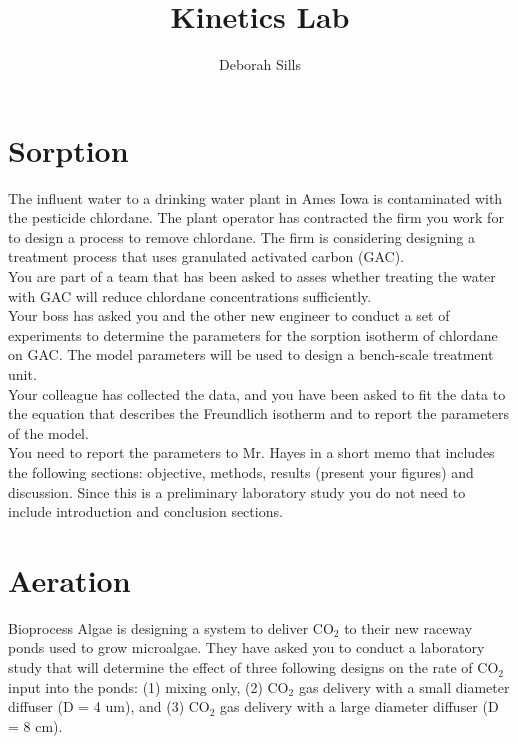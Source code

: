 \documentclass[12pt,letterpaper]{article}
\begin{document}
\setlength{\parindent}{0cm} 


\frenchspacing

\title {\textbf{Kinetics Lab}} 

\author {Deborah Sills}
\maketitle
\section {Sorption}
The influent water to a drinking water plant in Ames Iowa is contaminated with the pesticide chlordane.  The plant operator has contracted the firm you work for to design a process to remove chlordane. The firm is considering designing a treatment process that uses granulated activated carbon (GAC).\\

You are part of a team that has been asked to asses whether treating the water with GAC will reduce chlordane concentrations sufficiently.\\

Your boss has asked you and the other new engineer to conduct a set of experiments to determine the parameters for the sorption isotherm of chlordane on GAC.  The model  parameters will be used to design a bench-scale treatment unit.\\

Your colleague has collected the data, and you have been asked to fit the data to the equation that describes the Freundlich isotherm and to report the parameters of the model.\\

You need to report the parameters to Mr. Hayes in a short memo that includes the following sections: objective, methods, results (present your figures) and discussion. Since this is a preliminary laboratory study you do not need to include introduction and conclusion sections.

\section {Aeration}
Bioprocess Algae is designing a system to deliver CO$_2$ to their new raceway ponds used to grow microalgae.  They have asked you to conduct a laboratory study that will determine the effect of three following designs on the rate of CO$_2$ input into the ponds: (1) mixing only, (2) CO$_2$ gas delivery with a small diameter diffuser (D = 4 um), and (3) CO$_2$ gas delivery with a large diameter diffuser (D = 8 cm).
\end{document}
